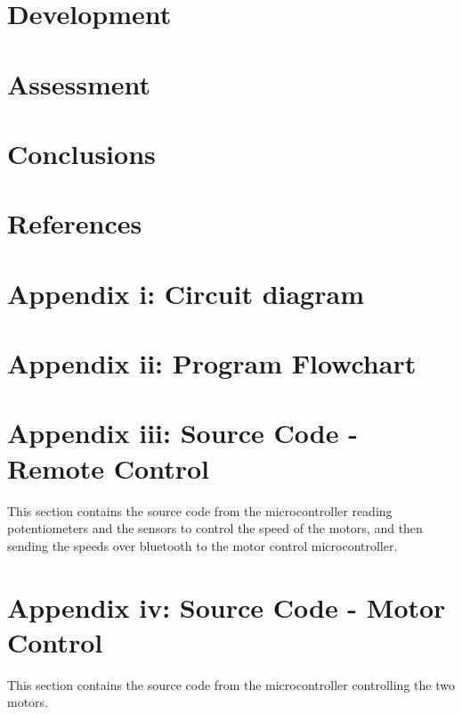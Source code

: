 \documentclass[a4paper,12pt]{article} %
\begin{document}
\section{Development}


\section{Assessment}


\section{Conclusions}


\section{References}


\section{Appendix i: Circuit diagram} %

\section{Appendix ii: Program Flowchart}


\clearpage
\section{Appendix iii: Source Code - Remote Control} %
This section contains the source code from the microcontroller reading potentiometers and the sensors to control the speed of the motors, and then sending the speeds over bluetooth to the motor control microcontroller.
\vspace{5mm}
\linespread{1}

\linespread{1.6}
\vspace{5mm}


\section{Appendix iv: Source Code - Motor Control} %
This section contains the source code from the microcontroller controlling the two motors.
\vspace{5mm}
\linespread{1}

\linespread{1.6}
\vspace{5mm}
\end{document}
